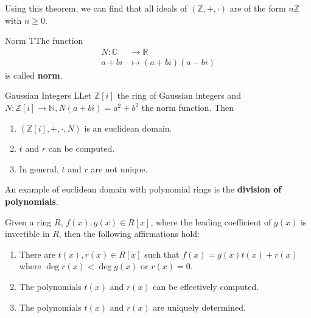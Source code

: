 \documentclass[12pt,a4paper]{article}
\begin{document}
Using this theorem, we can find that all ideals of $(\mathbb{Z},+,\cdot)$ are of the form $n \mathbb{Z}$ with $n \geq 0$.

\begin{defn}{Norm}
TThe function
\begin{equation*}
\begin{aligned}
N : \mathbb{C} & \to \mathbb{R} \\
a+bi & \mapsto (a+bi)(a-bi)
\end{aligned}
\end{equation*}
is called \textbf{norm}.
\end{defn}

\begin{thm}{Gaussian Integers}
LLet $\mathbb{Z}[i]$ the ring of Gaussian integers and $N : \mathbb{Z}[i] \to \mathbb{N}, N(a+bi) = a^2+b^2$ the norm function. Then
\begin{enumerate}
\item $(\mathbb{Z}[i],+,\cdot,N)$ is an euclidean domain.
\item $t$ and $r$ can be computed.
\item In general, $t$ and $r$ are not unique.
\end{enumerate}
\end{thm}

An example of euclidean domain with polynomial rings is the \textbf{division of polynomials}.

Given a ring $R$, $f(x), g(x) \in R[x]$, where the leading coefficient of $g(x)$ is invertible in $R$, then the following affirmations hold:
\begin{enumerate}
\item There are $t(x), r(x) \in R[x]$ such that $f(x) = g(x)t(x) + r(x)$ where $\deg r(x) < \deg g(x)$ or $r(x) = 0$.
\item The polynomials $t(x)$ and $r(x)$ can be effectively computed.
\item The polynomials $t(x)$ and $r(x)$ are uniquely determined.
\end{enumerate}
\end{document}
